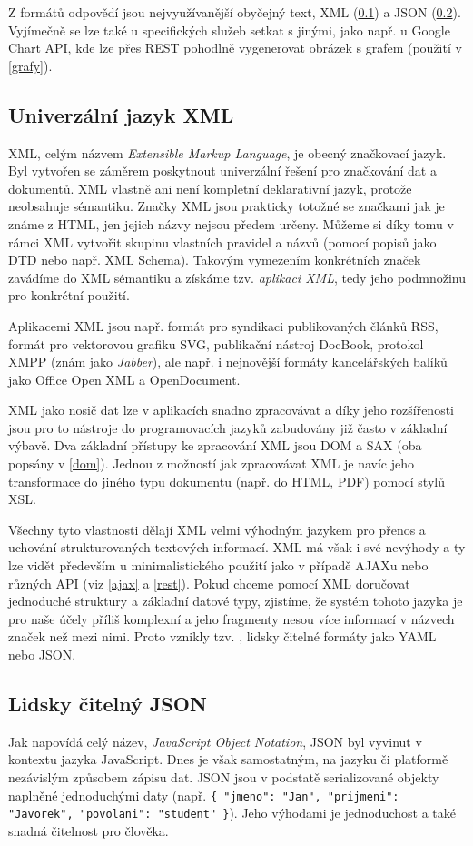 Z formátů odpovědí jsou nej\-využívanější obyčejný text, XML (\ref{xml})
a JSON (\ref{json}). Vyjímečně se lze také u specifických služeb
setkat s jinými, jako např. u Google Chart API, kde lze přes REST
pohodlně vygenerovat obrázek s grafem (použití v \ref{grafy}).

\subsection{Univerzální jazyk XML}\label{xml}
XML, celým názvem {\it Extensible Markup Language}, je obecný
značkovací jazyk. Byl vytvořen se záměrem poskytnout univerzální
řešení pro značkování dat a dokumentů. XML vlastně ani není kompletní
deklarativní jazyk, protože neobsahuje sémantiku. Značky XML jsou
prakticky totožné se značkami jak je známe z HTML, jen jejich názvy
nejsou předem určeny. Můžeme si díky tomu v rámci XML vytvořit skupinu
vlastních pravidel a názvů (pomocí popisů jako DTD nebo např. XML
Schema). Takovým vymezením konkrétních značek zavádíme do XML sémantiku a
získáme tzv. {\it aplikaci XML}, tedy jeho podmnožinu pro konkrétní
použití.

Aplikacemi XML jsou např. formát pro syndikaci publikovaných článků
RSS, formát pro vektorovou grafiku SVG, publikační nástroj DocBook,
protokol XMPP (znám jako {\it Jabber}), ale např. i nejnovější
formáty kancelářských balíků jako Office Open XML a OpenDocument.

XML jako nosič dat lze v aplikacích snadno zpracovávat a díky jeho
rozšířenosti jsou pro to nástroje do programovacích jazyků zabudovány
již často v základní výbavě. Dva základní přístupy ke
zpracování XML jsou DOM a SAX (oba popsány v \ref{dom}). Jednou z
možností jak zpracovávat XML je navíc jeho transformace do jiného typu
dokumentu (např. do HTML, PDF) pomocí stylů XSL.

Všechny tyto vlastnosti dělají XML velmi výhodným jazykem pro přenos
a uchování strukturovaných textových informací. XML má však i své
nevýhody a ty lze vidět především u minimalistického použití jako v
případě AJAXu nebo různých API (viz \ref{ajax} a \ref{rest}). Pokud
chceme pomocí XML doručovat jednoduché struktury a základní datové typy, zjistíme, že systém
tohoto jazyka je pro naše účely příliš komplexní a jeho fragmenty
nesou více informací v názvech značek než mezi nimi. Proto vznikly
tzv. , lidsky čitelné formáty jako YAML nebo JSON.

\subsection{Lidsky čitelný JSON}\label{json}
Jak napovídá celý název, {\it JavaScript Object Notation}, JSON byl
vyvinut v kontextu jazyka JavaScript. Dnes je však samostatným, na
jazyku či platformě nezávislým způsobem zápisu dat. JSON jsou v
podstatě serializované objekty naplněné jednoduchými daty (např.
{\tt \{ "jmeno": "Jan", "prijmeni": "Javorek", "povolani": "student"
\}}). Jeho výhodami je jednoduchost a také snadná čitelnost pro člověka.

